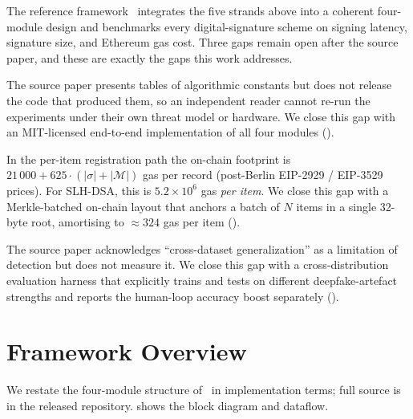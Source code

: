 \documentclass[11pt,a4paper]{article}
\theoremstyle{definition}
\theoremstyle{plain}
\theoremstyle{remark}
\begin{document}
The reference framework~\cite{bib4} integrates the five strands above
into a coherent four-module design and benchmarks every
digital-signature scheme on signing latency, signature size, and
Ethereum gas cost. Three gaps remain open after the source paper, and
these are exactly the gaps this work addresses.

\begin{description}[leftmargin=1.2em]
\item[Reproducibility gap.] The source paper presents tables of
algorithmic constants but does not release the code that produced
them, so an independent reader cannot re-run the experiments under
their own threat model or hardware. We close this gap with an
MIT-licensed end-to-end implementation of all four modules
().

\item[Storage gap.] In the per-item registration path the on-chain
footprint is $21\,000 + 625 \cdot (|\sigma| + |\mathcal{M}|)$ gas per
record (post-Berlin EIP-2929 / EIP-3529 prices). For SLH-DSA, this is
$5.2\!\times\!10^6$ gas \emph{per item}. We close this gap with a
Merkle-batched on-chain layout that anchors a batch of $N$ items in a
single 32-byte root, amortising to $\approx 324$ gas per item
().

\item[Generalisation gap.] The source paper acknowledges
``cross-dataset generalization'' as a limitation of detection but
does not measure it. We close this gap with a cross-distribution
evaluation harness that explicitly trains and tests on different
deepfake-artefact strengths and reports the human-loop accuracy boost
separately ().
\end{description}

\section{Framework Overview}\label{sec:framework}

We restate the four-module structure of~\cite{bib4} in implementation
terms; full source is in the released repository.
 shows the block diagram and dataflow.
\end{document}
